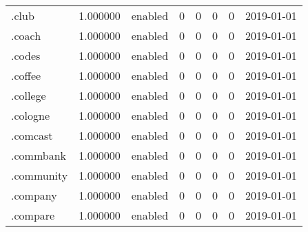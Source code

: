 \begin{tabular}{lrlrrrrl}
.club                     &          1.000000 &         enabled &                           0 &                           0 &                           0 &                   0 &           2019-01-01 \\
.coach                    &          1.000000 &         enabled &                           0 &                           0 &                           0 &                   0 &           2019-01-01 \\
.codes                    &          1.000000 &         enabled &                           0 &                           0 &                           0 &                   0 &           2019-01-01 \\
.coffee                   &          1.000000 &         enabled &                           0 &                           0 &                           0 &                   0 &           2019-01-01 \\
.college                  &          1.000000 &         enabled &                           0 &                           0 &                           0 &                   0 &           2019-01-01 \\
.cologne                  &          1.000000 &         enabled &                           0 &                           0 &                           0 &                   0 &           2019-01-01 \\
.comcast                  &          1.000000 &         enabled &                           0 &                           0 &                           0 &                   0 &           2019-01-01 \\
.commbank                 &          1.000000 &         enabled &                           0 &                           0 &                           0 &                   0 &           2019-01-01 \\
.community                &          1.000000 &         enabled &                           0 &                           0 &                           0 &                   0 &           2019-01-01 \\
.company                  &          1.000000 &         enabled &                           0 &                           0 &                           0 &                   0 &           2019-01-01 \\
.compare                  &          1.000000 &         enabled &                           0 &                           0 &                           0 &                   0 &           2019-01-01 \\

\end{tabular}
